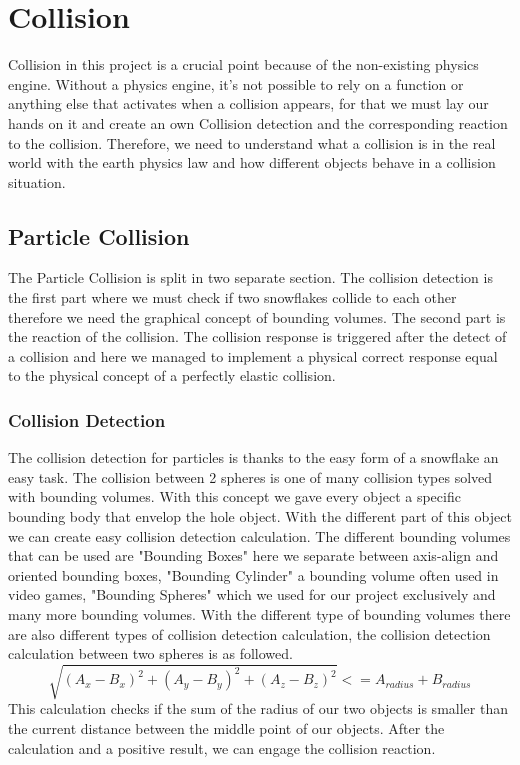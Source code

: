 \documentclass{sig-alternate-05-2015}
\begin{document}
\section{Collision}
Collision in this project is a crucial point because of the non-existing physics engine. Without a physics engine, it's not possible to rely on a function or anything else that activates when a collision appears, for that we must lay our hands on it and create an own Collision detection and the corresponding reaction to the collision. Therefore, we need to understand what a collision is in the real world with the earth physics law and how different objects behave in a collision situation.
\subsection{Particle Collision}
The Particle Collision is split in two separate section. The collision detection is the first part where we must check if two snowflakes collide to each other therefore we need the graphical concept of bounding volumes. The second part is the reaction of the collision. The collision response is triggered after the detect of a collision and here we managed to implement a physical correct response equal to the physical concept of a perfectly elastic collision.
\subsubsection{Collision Detection}
The collision detection for particles is thanks to the easy form of a snowflake an easy task. The collision between 2 spheres is one of many collision types solved with bounding volumes. With this concept we gave every object a specific bounding body that envelop the hole object. With the different part of this object we can create easy collision detection calculation. The different bounding volumes that can be used are "Bounding Boxes" here we separate between axis-align and oriented bounding boxes, "Bounding Cylinder" a bounding volume often used in video games, "Bounding Spheres" which we used for our project exclusively and many more bounding volumes. With the different type of bounding volumes there are also different types of collision detection calculation, the collision detection calculation between two spheres is as followed. 
\begin{equation}
\sqrt{\left ( A_x - B_x \right )^2 + \left ( A_y - B_y \right )^2 + \left ( A_z - B_z \right )^2} <= A_{radius} + B_{radius}
\end{equation}
This calculation checks if the sum of the radius of our two objects is smaller than the current distance between the middle point of our objects. After the calculation and a positive result, we can engage the collision reaction.
\end{document}
